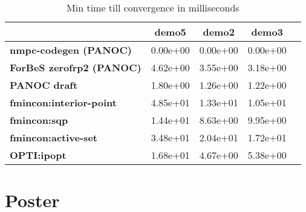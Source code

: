 \begin{table}[H]
	\centering
	\begin{tabular}{|l|	c|c|c|c|}
		\hline
		&\textbf{demo5}&\textbf{demo2}&\textbf{demo3}\\\hline
		\textbf{nmpc-codegen (PANOC)}&0.00e+00&0.00e+00&0.00e+00\\\hline
		\textbf{ForBeS zerofrp2 (PANOC)}&4.62e+00&3.55e+00&3.18e+00\\\hline
		\textbf{PANOC draft}&1.80e+00&1.26e+00&1.22e+00\\\hline
		\textbf{fmincon:interior-point}&4.85e+01&1.33e+01&1.05e+01\\\hline
		\textbf{fmincon:sqp}&1.44e+01&8.63e+00&9.95e+00\\\hline
		\textbf{fmincon:active-set}&3.48e+01&2.04e+01&1.72e+01\\\hline
		\textbf{OPTI:ipopt}&1.68e+01&4.67e+00&5.38e+00\\\hline
	\end{tabular}
	\caption{Min time till convergence in milliseconds}
	\label{tbl:min time till convergence with noise}
\end{table}

\chapter{Poster}
